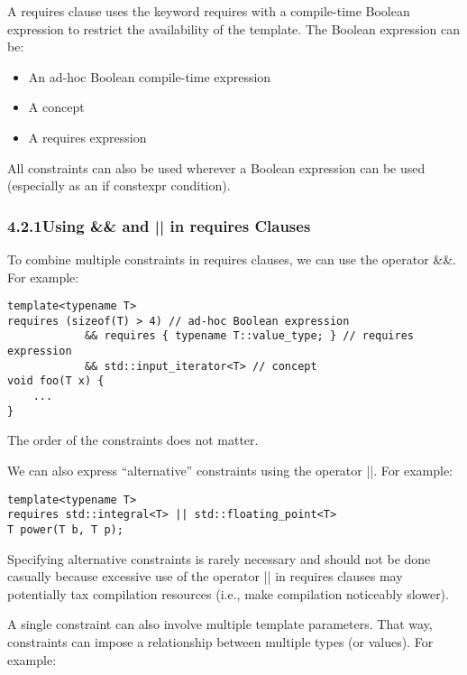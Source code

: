 A requires clause uses the keyword requires with a compile-time Boolean expression to restrict the availability of the template. The Boolean expression can be:

\begin{itemize}
\item
An ad-hoc Boolean compile-time expression

\item
A concept

\item
A requires expression
\end{itemize}

All constraints can also be used wherever a Boolean expression can be used (especially as an if constexpr condition).


\subsubsection*{ 4.2.1\hspace{0.2cm}Using \&\& and || in requires Clauses}

To combine multiple constraints in requires clauses, we can use the operator \&\&. For example:

\begin{lstlisting}[style=styleCXX]
template<typename T>
requires (sizeof(T) > 4) // ad-hoc Boolean expression
			&& requires { typename T::value_type; } // requires expression
			&& std::input_iterator<T> // concept
void foo(T x) {
	...
}
\end{lstlisting}

The order of the constraints does not matter.

We can also express “alternative” constraints using the operator ||. For example:

\begin{lstlisting}[style=styleCXX]
template<typename T>
requires std::integral<T> || std::floating_point<T>
T power(T b, T p);
\end{lstlisting}

Specifying alternative constraints is rarely necessary and should not be done casually because excessive use of the operator || in requires clauses may potentially tax compilation resources (i.e., make compilation noticeably slower).

A single constraint can also involve multiple template parameters. That way, constraints can impose a relationship between multiple types (or values). For example:

